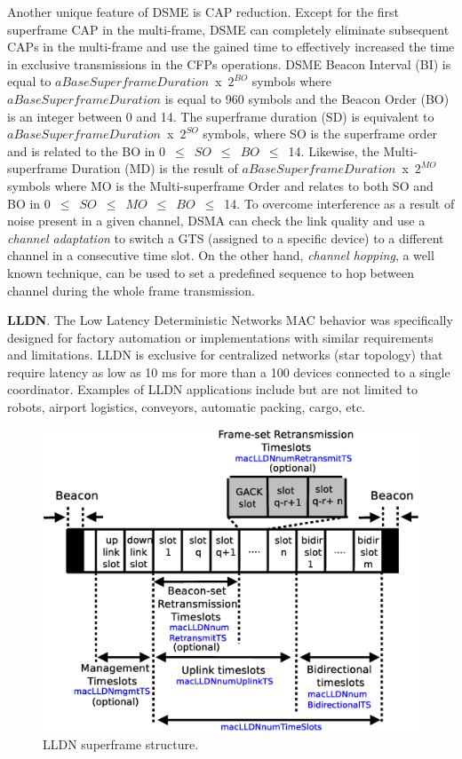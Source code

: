 \documentclass[conference]{IEEEtran}
\begin{document}
 Another unique feature of DSME is CAP reduction. Except for the first superframe CAP in the multi-frame, DSME can completely eliminate subsequent CAPs in the multi-frame and use the gained time to effectively increased the time in exclusive transmissions in the CFPs operations. DSME Beacon Interval (BI) is equal to \mbox{$aBaseSuperframeDuration$ x $2^{BO}$} symbols where $aBaseSuperframeDuration$ is equal to 960 symbols and the Beacon Order (BO) is an integer between 0 and 14. The superframe duration (SD) is equivalent to \mbox{$aBaseSuperframeDuration$ x $2^{SO}$} symbols, where SO is the superframe order and is related to the BO in \mbox{0 $\leq$ $SO$ $\leq$ $BO$ $\leq$ 14}. Likewise, the Multi-superframe Duration (MD) is the result of \mbox{$aBaseSuperframeDuration$ x $2^{MO}$} symbols where MO is the Multi-superframe Order and relates to both SO and BO in \mbox{0 $\leq$ $SO$ $\leq$ $MO$ $\leq$ $BO$ $\leq$ 14}. To overcome interference as a result of noise present in a given channel, DSMA can check the link quality and use a \textit{channel adaptation} to switch a GTS (assigned to a specific device) to a different channel in a consecutive time slot. On the other hand, \textit{channel hopping}, a well known technique, can be used to set a predefined sequence to hop between channel during the whole frame transmission.

\textbf{LLDN}. The Low Latency Deterministic Networks MAC behavior was specifically designed for factory automation or implementations with similar requirements and limitations. LLDN is exclusive for centralized networks (star topology) that require latency as low as 10 ms for more than a 100 devices connected to a single coordinator. Examples of LLDN applications include but are not limited to robots, airport logistics, conveyors, automatic packing, cargo, etc. 
\begin{figure}[!htb]
\centering
\includegraphics[scale=.28]{llframe}
\caption{LLDN superframe structure.}
\label{fig:llframe}
\end{figure}
\end{document}
